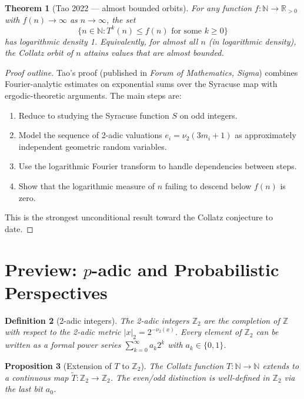 \documentclass[12pt,a4paper]{article}
\newtheorem{theorem}{Theorem}[section]
\newtheorem{proposition}[theorem]{Proposition}
\newtheorem{definition}[theorem]{Definition}
\begin{document}
\begin{theorem}[Tao 2022 — almost bounded orbits]\label{thm:tao}
For any function $f\colon \mathbb{N} \to \mathbb{R}_{>0}$ with $f(n) \to \infty$ as
$n \to \infty$, the set
\[
  \bigl\{ n \in \mathbb{N} : T^k(n) \leq f(n) \text{ for some } k \geq 0 \bigr\}
\]
has logarithmic density 1. Equivalently, for almost all $n$ (in logarithmic density),
the Collatz orbit of $n$ attains values that are almost bounded.
\end{theorem}

\begin{proof}[Proof outline]
Tao's proof \cite{Tao2022} (published in \emph{Forum of Mathematics, Sigma})
combines Fourier-analytic estimates on exponential sums
over the Syracuse map with ergodic-theoretic arguments. The main steps are:
\begin{enumerate}
  \item Reduce to studying the Syracuse function $S$ on odd integers.
  \item Model the sequence of 2-adic valuations $e_i = \nu_2(3m_i+1)$ as approximately
        independent geometric random variables.
  \item Use the logarithmic Fourier transform to handle dependencies between steps.
  \item Show that the logarithmic measure of $n$ failing to descend below $f(n)$ is zero.
\end{enumerate}
This is the strongest unconditional result toward the Collatz conjecture to date.
\end{proof}

\section{Preview: $p$-adic and Probabilistic Perspectives}\label{sec:padic_preview}

\begin{definition}[2-adic integers]\label{def:2adic}
The \emph{2-adic integers} $\mathbb{Z}_2$ are the completion of $\mathbb{Z}$ with respect
to the 2-adic metric $|x|_2 = 2^{-\nu_2(x)}$. Every element of $\mathbb{Z}_2$ can be written
as a formal power series $\sum_{k=0}^\infty a_k 2^k$ with $a_k \in \{0,1\}$.
\end{definition}

\begin{proposition}[Extension of $T$ to $\mathbb{Z}_2$]\label{prop:extension}
The Collatz function $T\colon \mathbb{N} \to \mathbb{N}$ extends to a continuous map
$\tilde{T}\colon \mathbb{Z}_2 \to \mathbb{Z}_2$. The even/odd distinction is well-defined
in $\mathbb{Z}_2$ via the last bit $a_0$.
\end{proposition}
\end{document}
